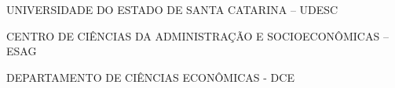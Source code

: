 
\renewcommand{\imprimircapa}{%
	\begin{capa}%
		\center

		{\fontseries{b}\selectfont\MakeTextUppercase{UNIVERSIDADE DO ESTADO DE SANTA CATARINA -- UDESC}}
		
		{\fontseries{b}\selectfont\MakeTextUppercase{Centro de Ciências da Administração e Socioeconômicas – ESAG}}
		
		{\fontseries{b}\selectfont\MakeTextUppercase{Departamento de Ciências Econômicas - DCE}}
		
		\vfill
		
		{\fontseries{b}\selectfont\MakeTextUppercase{\normalsize\imprimirautor}}
		
		\vfill
		\begin{center}
			{\fontseries{b}\selectfont\MakeTextUppercase{\imprimirtitulo}}
		\end{center}
		\vfill
		
		\vfill
		
		{\fontseries{b}\selectfont\MakeTextUppercase{\imprimirlocal}}
		\par
		{\selectfont \imprimirdata}
		\vspace*{1cm}
	\end{capa}
}

\imprimircapa